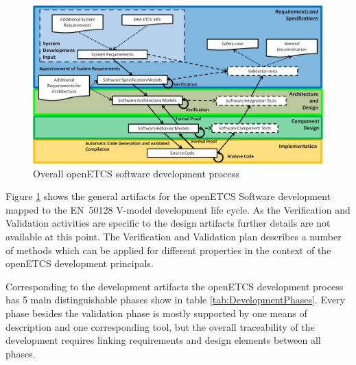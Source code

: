 \documentclass{template/openetcs_report}
\begin{document}
\begin{figure}[htbp]
\centering
\includegraphics[width=1.0\linewidth]{./images/openETCS-Software-Development_2-0}
\caption{Overall openETCS software development process}
\label{fig:DevopmentProcess}
\end{figure}

Figure \ref{fig:DevopmentProcess} shows the general artifacts for the openETCS Software development mapped to the EN~50128 V-model development life cycle. As the Verification and Validation activities are specific to the design artifacts further details are not available at this point. The Verification and Validation plan describes a number of methods which can be applied for different properties in the context of the openETCS development principals.

Corresponding to the development artifacts the openETCS development process has 5 main distinguishable phases show in table \ref{tab:DevelopmentPhases}. Every phase besides the validation phase is mostly supported by one means of description and one corresponding tool, but the overall traceability of the development requires linking requirements and design elements between all phases. 
\end{document}
